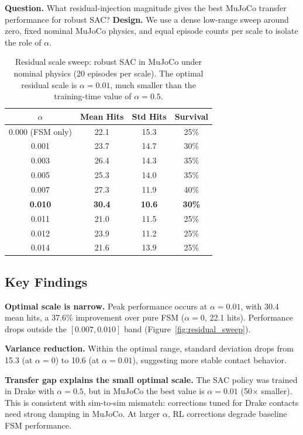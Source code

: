 \documentclass[10pt,twocolumn,letterpaper]{article}
\begin{document}
\textbf{Question.} What residual-injection magnitude gives the best MuJoCo transfer performance for robust SAC?
\textbf{Design.} We use a dense low-range sweep around zero, fixed nominal MuJoCo physics, and equal episode counts per scale to isolate the role of $\alpha$.

\begin{table}[t]
\centering
\caption{Residual scale sweep: robust SAC in MuJoCo under nominal physics (20 episodes per scale). The optimal residual scale is $\alpha = 0.01$, much smaller than the training-time value of $\alpha = 0.5$.}
\label{tab:residual_sweep}
\small
\begin{tabular}{cccc}
\toprule
$\alpha$ & Mean Hits & Std Hits & Survival \\
\midrule
0.000 (FSM only) & 22.1 & 15.3 & 25\% \\
0.001 & 23.7 & 14.7 & 30\% \\
0.003 & 26.4 & 14.3 & 35\% \\
0.005 & 25.3 & 14.0 & 35\% \\
0.007 & 27.3 & 11.9 & 40\% \\
\textbf{0.010} & \textbf{30.4} & \textbf{10.6} & \textbf{30\%} \\
0.011 & 21.0 & 11.5 & 25\% \\
0.012 & 23.9 & 11.2 & 25\% \\
0.014 & 21.6 & 13.9 & 25\% \\
\bottomrule
\end{tabular}
\end{table}

\subsection{Key Findings}
\textbf{Optimal scale is narrow.} Peak performance occurs at $\alpha = 0.01$, with 30.4 mean hits, a 37.6\% improvement over pure FSM ($\alpha = 0$, 22.1 hits). Performance drops outside the $[0.007, 0.010]$ band (Figure~\ref{fig:residual_sweep}).

\textbf{Variance reduction.} Within the optimal range, standard deviation drops from 15.3 (at $\alpha = 0$) to 10.6 (at $\alpha = 0.01$), suggesting more stable contact behavior.

\textbf{Transfer gap explains the small optimal scale.}
The SAC policy was trained in Drake with $\alpha = 0.5$, but in MuJoCo the best value is $\alpha = 0.01$ (50$\times$ smaller). This is consistent with sim-to-sim mismatch: corrections tuned for Drake contacts need strong damping in MuJoCo. At larger $\alpha$, RL corrections degrade baseline FSM performance.
\end{document}
